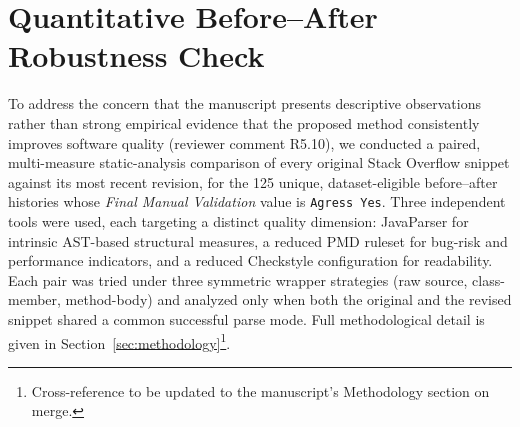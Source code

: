 %
%
%
%

\section{Quantitative Before--After Robustness Check}
\label{sec:before-after-robustness}

To address the concern that the manuscript presents descriptive
observations rather than strong empirical evidence that the proposed
method consistently improves software quality (reviewer comment R5.10), we
conducted a paired, multi-measure static-analysis comparison of every
original Stack Overflow snippet against its most recent revision, for the
125 unique, dataset-eligible before--after histories whose \emph{Final
Manual Validation} value is \texttt{Agress Yes}. Three independent tools
were used, each targeting a distinct quality dimension: JavaParser for
intrinsic AST-based structural measures, a reduced PMD ruleset for
bug-risk and performance indicators, and a reduced Checkstyle
configuration for readability. Each pair was tried under three
symmetric wrapper strategies (raw source, class-member, method-body) and
analyzed only when both the original and the revised snippet shared a
common successful parse mode. Full methodological detail is given in
Section~\ref{sec:methodology}\footnote{Cross-reference to be updated to
the manuscript's Methodology section on merge.}.

